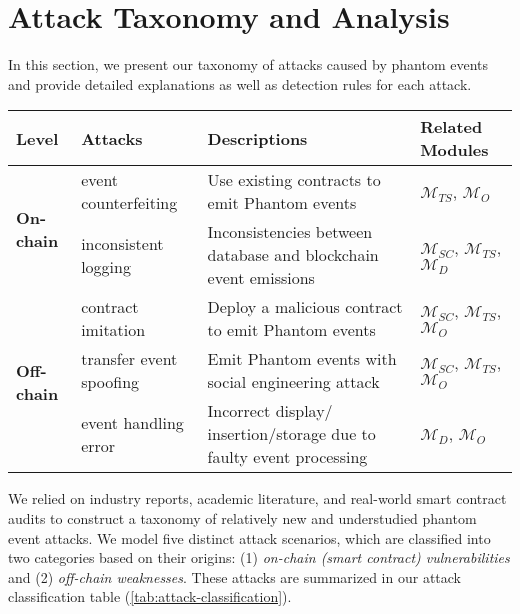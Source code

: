 \section{Attack Taxonomy and Analysis}\label{sec:vector}

In this section, we present our taxonomy of attacks caused by phantom events and provide detailed
explanations as well as detection rules for each attack.

\begin{table*}[ht]
\centering
\caption{Mapping relationship between attack vectors and related modules.}
\label{tab:attack-classification}
\begin{tabular}{l|l|p{8.5cm}|p{3cm}}
\toprule
\textbf{Level} & \textbf{Attacks} & \textbf{Descriptions} & \textbf{Related Modules} \\
\midrule
\multirow{2}{*}{\textbf{On-chain}}
& event counterfeiting & Use existing contracts to emit Phantom events & \(\bm{\mathcal{M}}_{TS}\), \(\bm{\mathcal{M}}_{O}\) \\
\cmidrule{2-4}
& inconsistent logging & Inconsistencies between database and blockchain event emissions & \(\bm{\mathcal{M}}_{SC}\), \(\bm{\mathcal{M}}_{TS}\), \(\bm{\mathcal{M}}_{D}\) \\
\midrule
\multirow{3}{*}{\textbf{Off-chain}}
&contract imitation & Deploy a malicious contract to emit Phantom events & \(\bm{\mathcal{M}}_{SC}\), \(\bm{\mathcal{M}}_{TS}\), \(\bm{\mathcal{M}}_{O}\) \\
\cmidrule{2-4}
& transfer event spoofing & Emit Phantom events with social engineering attack & \(\bm{\mathcal{M}}_{SC}\), \(\bm{\mathcal{M}}_{TS}\), \(\bm{\mathcal{M}}_{O}\) \\
\cmidrule{2-4}
& event handling error & Incorrect display/ insertion/storage due to faulty event processing & \(\bm{\mathcal{M}}_{D}\), \(\bm{\mathcal{M}}_{O}\) \\
\bottomrule
\end{tabular}
\end{table*}

We relied on industry reports, academic literature, and real-world smart contract audits to construct a taxonomy of relatively new and understudied phantom event attacks. We model five distinct attack
scenarios, which are classified into two categories based on their origins:
(1) \emph{on-chain (smart contract) vulnerabilities} and (2) \emph{off-chain weaknesses}.
These attacks are summarized in our attack classification table (\cref{tab:attack-classification}).

